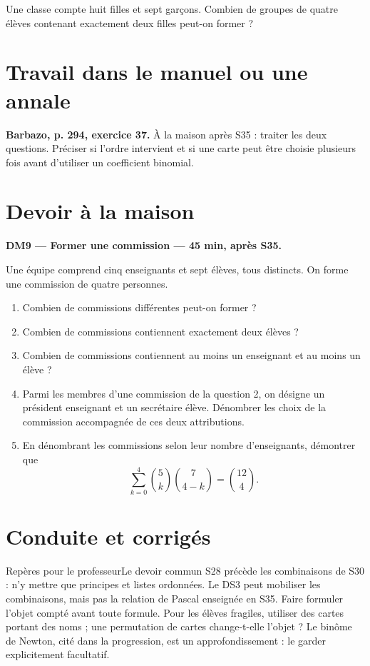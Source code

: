 Une classe compte huit filles et sept garçons. Combien de groupes de quatre élèves contenant exactement deux filles peut-on former ?

\section{Travail dans le manuel ou une annale}\textbf{Barbazo, p. 294, exercice 37.} À la maison après S35 : traiter les deux questions. Préciser si l'ordre intervient et si une carte peut être choisie plusieurs fois avant d'utiliser un coefficient binomial.

\section{Devoir à la maison}\textbf{DM9 --- Former une commission --- 45 min, après S35.}\par Une équipe comprend cinq enseignants et sept élèves, tous distincts. On forme une commission de quatre personnes.
\begin{enumerate}\item Combien de commissions différentes peut-on former ?
\item Combien de commissions contiennent exactement deux élèves ?
\item Combien de commissions contiennent au moins un enseignant et au moins un élève ?
\item Parmi les membres d'une commission de la question 2, on désigne un président enseignant et un secrétaire élève. Dénombrer les choix de la commission accompagnée de ces deux attributions.
\item En dénombrant les commissions selon leur nombre d'enseignants, démontrer que \[\sum_{k=0}^4\binom5k\binom7{4-k}=\binom{12}4.\]\end{enumerate}

\ifprof\clearpage\section{Conduite et corrigés}\begin{profbox}{Repères pour le professeur}Le devoir commun S28 précède les combinaisons de S30 : n'y mettre que principes et listes ordonnées. Le DS3 peut mobiliser les combinaisons, mais pas la relation de Pascal enseignée en S35. Faire formuler l'objet compté avant toute formule. Pour les élèves fragiles, utiliser des cartes portant des noms ; une permutation de cartes change-t-elle l'objet ? Le binôme de Newton, cité dans la progression, est un approfondissement : le garder explicitement facultatif.\end{profbox}

